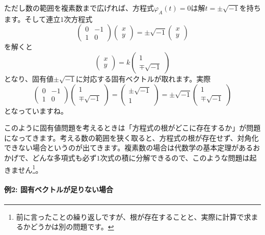 ただし数の範囲を複素数まで広げれば、方程式$\varphi_A(t) = 0$は解$t = \pm\sqrt{-1}$を持ちます。そして連立$1$次方程式
\[
\begin{pmatrix}
0 & -1 \\
1 & 0
\end{pmatrix}
\begin{pmatrix}
x \\
y
\end{pmatrix}
=
\pm\sqrt{-1}
\begin{pmatrix}
x \\
y
\end{pmatrix}
\]
を解くと
\[
\begin{pmatrix}
x \\
y
\end{pmatrix}
=
k
\begin{pmatrix}
1 \\
\mp \sqrt{-1}
\end{pmatrix}
\]
となり、固有値$\pm\sqrt{-1}$に対応する固有ベクトルが取れます。実際
\[
\begin{pmatrix}
0 & -1 \\
1 & 0
\end{pmatrix}
\begin{pmatrix}
1 \\
\mp\sqrt{-1}
\end{pmatrix}
=
\begin{pmatrix}
\pm\sqrt{-1} \\
1
\end{pmatrix}
= \pm\sqrt{-1}
\begin{pmatrix}
1 \\
\mp \sqrt{-1}
\end{pmatrix}
\]
となっていますね。

このように固有値問題を考えるときは「方程式の根がどこに存在するか」が問題になってきます。考える数の範囲を狭く取ると、方程式の根が存在せず、対角化できない場合というのが出てきます。複素数の場合は代数学の基本定理があるおかげで、どんな多項式も必ず$1$次式の積に分解できるので、このような問題は起きません\footnote{前に言ったことの繰り返しですが、根が存在することと、実際に計算で求まるかどうかは別の問題です。}。

\paragraph{例2: 固有ベクトルが足りない場合}

